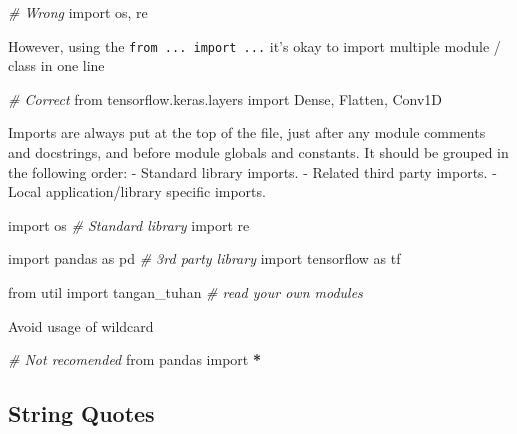 \documentclass[
]{book}
\newenvironment{Shaded}{\begin{snugshade}}{\end{snugshade}}
\newcommand{\CommentTok}[1]{\textcolor[rgb]{0.56,0.35,0.01}{\textit{#1}}}
\newcommand{\ImportTok}[1]{#1}
\newcommand{\NormalTok}[1]{#1}
\newcommand{\OperatorTok}[1]{\textcolor[rgb]{0.81,0.36,0.00}{\textbf{#1}}}
\begin{document}
\begin{Shaded}
\begin{Highlighting}[]
\CommentTok{\# Wrong }
\ImportTok{import}\NormalTok{ os, re}
\end{Highlighting}
\end{Shaded}

However, using the \texttt{from\ ...\ import\ ...} it's okay to import multiple module / class in one line

\begin{Shaded}
\begin{Highlighting}[]
\CommentTok{\# Correct }
\ImportTok{from}\NormalTok{ tensorflow.keras.layers }\ImportTok{import}\NormalTok{ Dense, Flatten, Conv1D}
\end{Highlighting}
\end{Shaded}

Imports are always put at the top of the file, just after any module comments and docstrings, and before module globals and constants. It should be grouped in the following order:
- Standard library imports.
- Related third party imports.
- Local application/library specific imports.

\begin{Shaded}
\begin{Highlighting}[]
\ImportTok{import}\NormalTok{ os  }\CommentTok{\# Standard library }
\ImportTok{import}\NormalTok{ re }

\ImportTok{import}\NormalTok{ pandas }\ImportTok{as}\NormalTok{ pd  }\CommentTok{\# 3rd party library}
\ImportTok{import}\NormalTok{ tensorflow }\ImportTok{as}\NormalTok{ tf }

\ImportTok{from}\NormalTok{ util }\ImportTok{import}\NormalTok{ tangan\_tuhan }\CommentTok{\# read your own modules}
\end{Highlighting}
\end{Shaded}

Avoid usage of wildcard

\begin{Shaded}
\begin{Highlighting}[]
\CommentTok{\# Not recomended }
\ImportTok{from}\NormalTok{ pandas }\ImportTok{import} \OperatorTok{*}
\end{Highlighting}
\end{Shaded}

\hypertarget{string-quotes}{%
\subsection{String Quotes}\label{string-quotes}}
\end{document}
